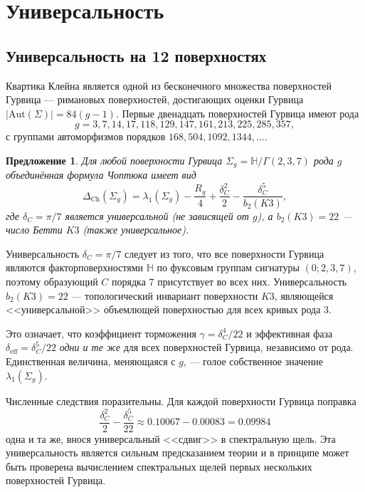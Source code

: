 \documentclass[12pt,a4paper]{article}
\newtheorem{proposition}[theorem]{Предложение}
\theoremstyle{definition}
\theoremstyle{remark}
\newcommand{\HH}{\mathbb{H}}
\newcommand{\Aut}{\mathrm{Aut}}
\begin{document}
\section{Универсальность}
\label{sec:universality}

\subsection{Универсальность на 12 поверхностях}

Квартика Клейна является одной из бесконечного множества поверхностей Гурвица --- римановых поверхностей, достигающих оценки Гурвица $|\Aut(\Sigma)| = 84(g-1)$. Первые двенадцать поверхностей Гурвица имеют рода
\begin{equation}
g = 3, 7, 14, 17, 118, 129, 147, 161, 213, 225, 285, 357,
\end{equation}
с группами автоморфизмов порядков $168, 504, 1092, 1344, \ldots$.

\begin{proposition}
\label{prop:universality}
Для любой поверхности Гурвица $\Sigma_g = \HH/\Gamma(2,3,7)$ рода $g$ объединённая формула Чоптюка имеет вид
\begin{equation}
\Delta_{\mathrm{Ch}}(\Sigma_g) = \lambda_1(\Sigma_g) - \frac{R_g}{4} + \frac{\delta_C^2}{2} - \frac{\delta_C^5}{b_2(K3)},
\end{equation}
где $\delta_C = \pi/7$ является \emph{универсальной} (не зависящей от $g$), а $b_2(K3) = 22$ --- число Бетти $K3$ (также универсальное).
\end{proposition}

Универсальность $\delta_C = \pi/7$ следует из того, что все поверхности Гурвица являются факторповерхностями $\HH$ по фуксовым группам сигнатуры $(0; 2, 3, 7)$, поэтому образующий $C$ порядка $7$ присутствует во всех них. Универсальность $b_2(K3) = 22$ --- топологический инвариант поверхности $K3$, являющейся <<универсальной>> объемлющей поверхностью для всех кривых рода $3$.

Это означает, что коэффициент торможения $\gamma = \delta_C^4/22$ и эффективная фаза $\delta_{\mathrm{eff}} = \delta_C^5/22$ \emph{одни и те же} для всех поверхностей Гурвица, независимо от рода. Единственная величина, меняющаяся с $g$, --- голое собственное значение $\lambda_1(\Sigma_g)$.

Численные следствия поразительны. Для каждой поверхности Гурвица поправка
\begin{equation}
\frac{\delta_C^2}{2} - \frac{\delta_C^5}{22} \approx 0.10067 - 0.00083 = 0.09984
\end{equation}
одна и та же, внося универсальный <<сдвиг>> в спектральную щель. Эта универсальность является сильным предсказанием теории и в принципе может быть проверена вычислением спектральных щелей первых нескольких поверхностей Гурвица.
\end{document}
